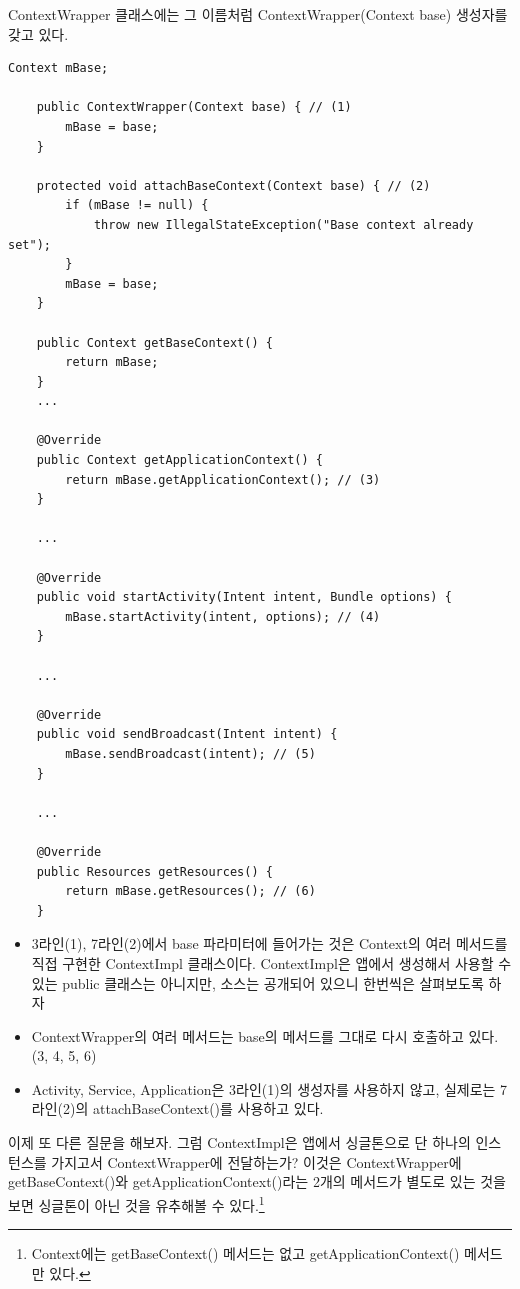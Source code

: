 ContextWrapper 클래스에는 그 이름처럼 ContextWrapper(Context base) 생성자를 갖고 있다.
\begin{lstlisting}[frame=single, caption=ContextWrapper.java]
    Context mBase;

    public ContextWrapper(Context base) { // (1)
        mBase = base;
    }

	protected void attachBaseContext(Context base) { // (2)
        if (mBase != null) {
            throw new IllegalStateException("Base context already set");
        }
        mBase = base;
    }
    
    public Context getBaseContext() {
        return mBase;
    }
    ...
    
    @Override
    public Context getApplicationContext() {
        return mBase.getApplicationContext(); // (3)
    }
    
    ...
    
    @Override
    public void startActivity(Intent intent, Bundle options) {
        mBase.startActivity(intent, options); // (4)
    }
    
    ...
    
    @Override
    public void sendBroadcast(Intent intent) {
        mBase.sendBroadcast(intent); // (5)
    }

	... 
	
    @Override
    public Resources getResources() {
        return mBase.getResources(); // (6)
    }
\end{lstlisting}
\begin{itemize}
\item 3라인(1), 7라인(2)에서 base 파라미터에 들어가는 것은 Context의 여러 메서드를 직접 구현한 ContextImpl 클래스이다. ContextImpl은 앱에서 생성해서 사용할 수 있는 public 클래스는 아니지만, 소스는 공개되어 있으니 한번씩은 살펴보도록 하자
\item ContextWrapper의 여러 메서드는 base의 메서드를 그대로 다시 호출하고 있다.(3, 4, 5, 6)
\item Activity, Service, Application은 3라인(1)의 생성자를 사용하지 않고, 실제로는 7라인(2)의 attachBaseContext()를 사용하고 있다.
\end{itemize}

이제 또 다른 질문을 해보자. 그럼 ContextImpl은 앱에서 싱글톤으로 단 하나의 인스턴스를 가지고서 ContextWrapper에 전달하는가?
이것은 ContextWrapper에 getBaseContext()와 getApplicationContext()라는 2개의 메서드가 별도로 있는 것을 보면 싱글톤이 아닌 것을 유추해볼 수 있다.\footnote{Context에는 getBaseContext() 메서드는 없고 getApplicationContext() 메서드만 있다.}\\

